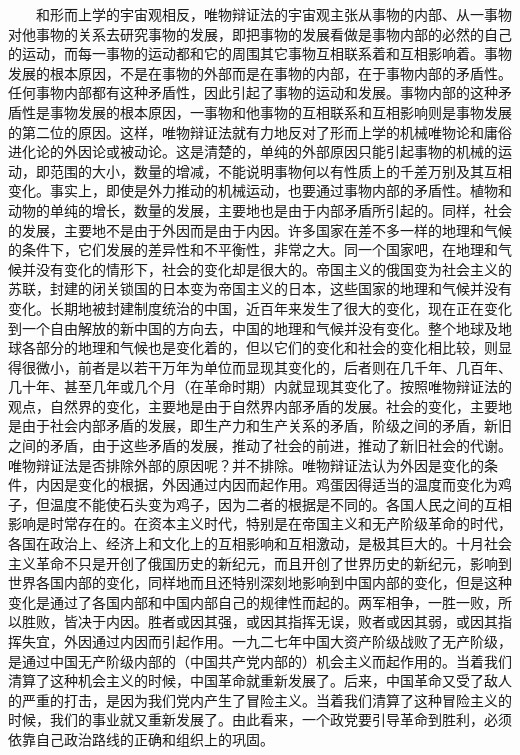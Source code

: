 \documentclass[cn,11pt,chinese]{elegantbook}
\begin{document}
　　和形而上学的宇宙观相反，唯物辩证法的宇宙观主张从事物的内部、从一事物对他事物的关系去研究事物的发展，即把事物的发展看做是事物内部的必然的自己的运动，而每一事物的运动都和它的周围其它事物互相联系着和互相影响着。事物发展的根本原因，不是在事物的外部而是在事物的内部，在于事物内部的矛盾性。任何事物内部都有这种矛盾性，因此引起了事物的运动和发展。事物内部的这种矛盾性是事物发展的根本原因，一事物和他事物的互相联系和互相影响则是事物发展的第二位的原因。这样，唯物辩证法就有力地反对了形而上学的机械唯物论和庸俗进化论的外因论或被动论。这是清楚的，单纯的外部原因只能引起事物的机械的运动，即范围的大小，数量的增减，不能说明事物何以有性质上的千差万别及其互相变化。事实上，即使是外力推动的机械运动，也要通过事物内部的矛盾性。植物和动物的单纯的增长，数量的发展，主要地也是由于内部矛盾所引起的。同样，社会的发展，主要地不是由于外因而是由于内因。许多国家在差不多一样的地理和气候的条件下，它们发展的差异性和不平衡性，非常之大。同一个国家吧，在地理和气候并没有变化的情形下，社会的变化却是很大的。帝国主义的俄国变为社会主义的苏联，封建的闭关锁国的日本变为帝国主义的日本，这些国家的地理和气候并没有变化。长期地被封建制度统治的中国，近百年来发生了很大的变化，现在正在变化到一个自由解放的新中国的方向去，中国的地理和气候并没有变化。整个地球及地球各部分的地理和气候也是变化着的，但以它们的变化和社会的变化相比较，则显得很微小，前者是以若干万年为单位而显现其变化的，后者则在几千年、几百年、几十年、甚至几年或几个月（在革命时期）内就显现其变化了。按照唯物辩证法的观点，自然界的变化，主要地是由于自然界内部矛盾的发展。社会的变化，主要地是由于社会内部矛盾的发展，即生产力和生产关系的矛盾，阶级之间的矛盾，新旧之间的矛盾，由于这些矛盾的发展，推动了社会的前进，推动了新旧社会的代谢。唯物辩证法是否排除外部的原因呢？并不排除。唯物辩证法认为外因是变化的条件，内因是变化的根据，外因通过内因而起作用。鸡蛋因得适当的温度而变化为鸡子，但温度不能使石头变为鸡子，因为二者的根据是不同的。各国人民之间的互相影响是时常存在的。在资本主义时代，特别是在帝国主义和无产阶级革命的时代，各国在政治上、经济上和文化上的互相影响和互相激动，是极其巨大的。十月社会主义革命不只是开创了俄国历史的新纪元，而且开创了世界历史的新纪元，影响到世界各国内部的变化，同样地而且还特别深刻地影响到中国内部的变化，但是这种变化是通过了各国内部和中国内部自己的规律性而起的。两军相争，一胜一败，所以胜败，皆决于内因。胜者或因其强，或因其指挥无误，败者或因其弱，或因其指挥失宜，外因通过内因而引起作用。一九二七年中国大资产阶级战败了无产阶级，是通过中国无产阶级内部的（中国共产党内部的）机会主义而起作用的。当着我们清算了这种机会主义的时候，中国革命就重新发展了。后来，中国革命又受了敌人的严重的打击，是因为我们党内产生了冒险主义。当着我们清算了这种冒险主义的时候，我们的事业就又重新发展了。由此看来，一个政党要引导革命到胜利，必须依靠自己政治路线的正确和组织上的巩固。\\
\end{document}
